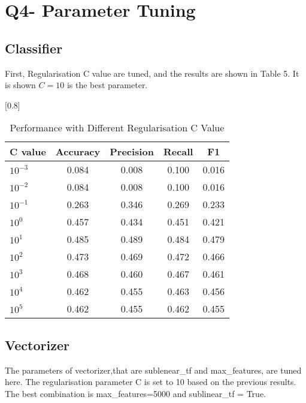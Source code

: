 \documentclass[a4paper,11pt]{article}
\begin{document}
\section{Q4- Parameter Tuning}
\subsection{Classifier}
First, Regularisation C value are tuned, and the results are shown in Table 5.
It is shown $C=10$ is the best parameter.%

\begin{table}[htbp]
    \centering
    \caption{Performance with Different Regularisation C Value}
    \small
    \scalebox{0.8}[0.8]{
    \begin{tabular}{l|cccc}
        C value & Accuracy & Precision & Recall & F1 \\ \hline 
        $10^{-3}$ &0.084 & 0.008& 0.100& 0.016\\ 
        $10^{-2}$ &0.084 &0.008 &0.100 &0.016\\ 
        $10^{-1}$ &0.263 &0.346 &0.269 &0.233\\ 
        $10^{0}$  &0.457 &0.434 &0.451 &0.421\\ 
        \rowcolor[rgb]{0.9,0.9,0}$10^{1}$  &0.485 &0.489 &0.484 &0.479\\ 
        $10^{2}$  &0.473 &0.469 &0.472 &0.466\\ 
        $10^{3}$  &0.468 &0.460 &0.467 &0.461\\ 
        $10^{4}$  &0.462 &0.455 &0.463 &0.456\\ 
        $10^{5}$  &0.462 &0.455 &0.462 &0.455\\ 

    \end{tabular}
    }
\end{table}
\subsection{Vectorizer}
The parameters of vectorizer,that are sublenear\_tf and max\_features, are tuned here.
The regularisation parameter C is set to 10 based on the previous results.
The best combination is max\_features=5000 and  sublinear\_tf = True. 
\end{document}
